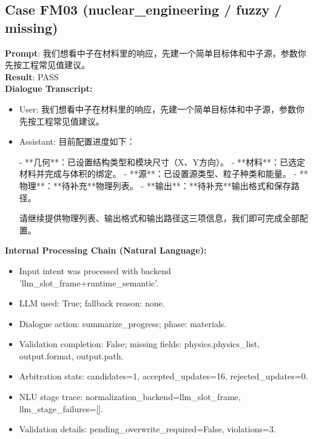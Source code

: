 \documentclass[11pt]{ctexart}
\begin{document}
\subsection{Case FM03 (nuclear\_engineering / fuzzy / missing)}
\textbf{Prompt}: 我们想看中子在材料里的响应，先建一个简单目标体和中子源，参数你先按工程常见值建议。\\
\textbf{Result}: PASS\\
\textbf{Dialogue Transcript:}
\begin{itemize}
\item User: 我们想看中子在材料里的响应，先建一个简单目标体和中子源，参数你先按工程常见值建议。
\item Assistant: 目前配置进度如下：

- **几何**：已设置结构类型和模块尺寸（X、Y方向）。
- **材料**：已选定材料并完成与体积的绑定。
- **源**：已设置源类型、粒子种类和能量。
- **物理**：**待补充**物理列表。
- **输出**：**待补充**输出格式和保存路径。

请继续提供物理列表、输出格式和输出路径这三项信息，我们即可完成全部配置。
\end{itemize}
\textbf{Internal Processing Chain (Natural Language):}
\begin{itemize}
\item Input intent was processed with backend 'llm\_slot\_frame+runtime\_semantic'.
\item LLM used: True; fallback reason: none.
\item Dialogue action: summarize\_progress; phase: materials.
\item Validation completion: False; missing fields: physics.physics\_list, output.format, output.path.
\item Arbitration stats: candidates=1, accepted\_updates=16, rejected\_updates=0.
\item NLU stage trace: normalization\_backend=llm\_slot\_frame, llm\_stage\_failures=[].
\item Validation details: pending\_overwrite\_required=False, violations=3.
\end{itemize}
\end{document}

